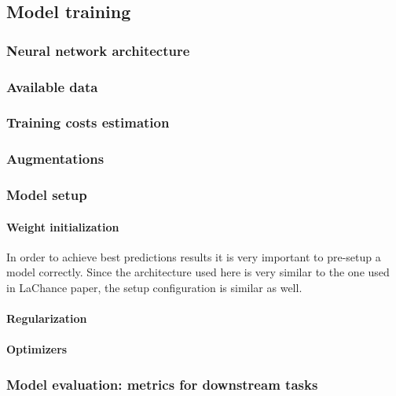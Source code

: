 \subsection{Model training}
    \subsubsection{Neural network architecture}
        
    \subsubsection{Available data}
        
    \subsubsection{Training costs estimation}
        
    \subsubsection{Augmentations}
        \label{section:augmentations}
        
    \subsubsection{Model setup}
        \paragraph{Weight initialization}
        In order to achieve best predictions results it is very important to pre-setup a model correctly. Since the architecture used here is very similar to the one used in LaChance paper, the setup configuration is similar as well.  
        
        \paragraph{Regularization}
        \label{section:regularization}
        
        \paragraph{Optimizers}
        
    \subsubsection{Model evaluation: metrics for downstream tasks}
        